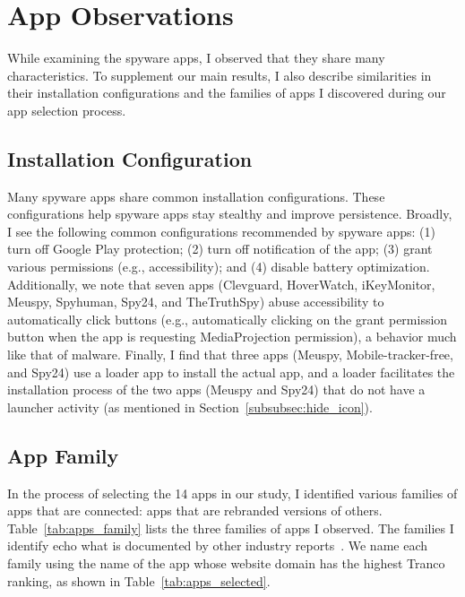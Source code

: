 \hspace*{0.1in}\newpage
\appendix


\section{App Observations}
\label{subsec:additional_observation}

While examining the spyware apps, I observed that they
share many characteristics.  To supplement our main results, I also
describe similarities in their installation configurations and the
families of apps I discovered during our app selection process.

\subsection{Installation Configuration}
\label{subsubsec:install_configure}

Many spyware apps share common installation configurations.  These
configurations help spyware apps stay stealthy and improve
persistence. Broadly, I see the following common configurations
recommended by spyware apps: (1) turn off Google Play protection; (2)
turn off notification of the app; (3) grant various permissions (e.g.,
accessibility); and (4) disable battery optimization.  Additionally,
we note that seven apps (Clevguard, HoverWatch, iKeyMonitor, Meuspy, Spyhuman, Spy24, and TheTruthSpy) abuse accessibility to
automatically click buttons (e.g., automatically clicking on the grant permission button when the app is requesting MediaProjection permission), a
behavior much like that of malware. Finally, I find that three apps
(Meuspy, Mobile-tracker-free, and Spy24) use a loader app to install
the actual app, and a loader facilitates the installation process of the two apps (Meuspy and Spy24) that do not have a launcher activity (as mentioned in Section~\ref{subsubsec:hide_icon}).

\subsection{App Family}
\label{subsubsec:app_family}

In the process of selecting the 14 apps in our study, I identified
various families of apps that are connected: apps
that are rebranded versions of others.  Table~\ref{tab:apps_family} lists the
three families of apps I observed. The families I identify echo what is documented by
other industry reports~\cite{Tekstalk86:online,
esetandr4:online}. We name each family using the name
of the app whose website domain has the highest Tranco ranking, as shown in
Table~\ref{tab:apps_selected}.

